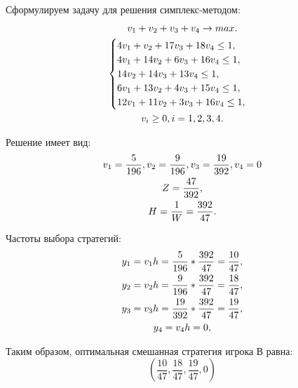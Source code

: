 \documentclass[12pt,a4paper,oneside]{extarticle}
\begin{document}
    Сформулируем задачу для решения симплекс-методом:
    \begin{gather}
        v_1+v_2+v_3+v_4 \rightarrow max. \notag \\
        \begin{cases}
            4v_1 + v_2 + 17v_3 + 18v_4 \leq 1, \notag \\
            4v_1 + 14v_2 + 6v_3 + 16v_4 \leq 1, \notag \\
            14v_2 + 14v_3 + 13v_4 \leq 1, \notag \\
            6v_1 + 13v_2 + 4v_3 + 15v_4  \leq 1, \notag \\
            12v_1 + 11v_2 + 3v_3 + 16v_4  \leq 1, \notag \\
        \end{cases} \notag \\
        v_i \geq 0, i=1,2,3,4.\notag
    \end{gather} 

    Решение имеет вид:
    \begin{gather}
        v_1 = \frac{5}{196}, v_2 = \frac{9}{196}, v_3 = \frac{19}{392}, v_4= 0 \notag \\
        Z = \frac{47}{392}, \notag \\
        H = \frac{1}{W} = \frac{392}{47}. \notag
    \end{gather}

        Частоты выбора стратегий:
    \begin{gather}
        y_1 = v_1h = \frac{5}{196} * \frac{392}{47} = \frac{10}{47}, \notag \\
        y_2 = v_2h = \frac{9}{196} * \frac{392}{47} = \frac{18}{47}, \notag \\
        y_3 = v_3h = \frac{19}{392} * \frac{392}{47} = \frac{19}{47}, \notag \\
        y_4 = v_4h = 0, \notag 
    \end{gather}

    Таким образом, оптимальная смешанная стратегия игрока В равна: 
    $$(\frac{10}{47}, \frac{18}{47}, \frac{19}{47}, 0)$$
\end{document}
